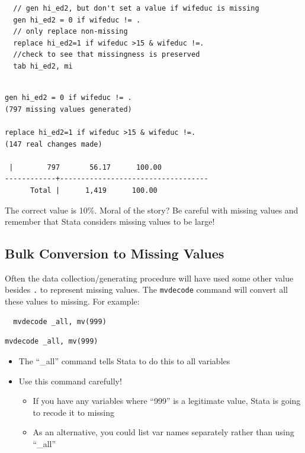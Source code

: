 \documentclass[]{book}
\providecommand{\tightlist}{%
  \setlength{\itemsep}{0pt}\setlength{\parskip}{0pt}}
\begin{document}
\begin{verbatim}
  // gen hi_ed2, but don't set a value if wifeduc is missing
  gen hi_ed2 = 0 if wifeduc != . 
  // only replace non-missing
  replace hi_ed2=1 if wifeduc >15 & wifeduc !=. 
  //check to see that missingness is preserved
  tab hi_ed2, mi
\end{verbatim}

\begin{verbatim}

gen hi_ed2 = 0 if wifeduc != . 
(797 missing values generated)

replace hi_ed2=1 if wifeduc >15 & wifeduc !=. 
(147 real changes made)

 |        797       56.17      100.00
------------+-----------------------------------
      Total |      1,419      100.00
\end{verbatim}

The correct value is 10\%. Moral of the story? Be careful with missing
values and remember that Stata considers missing values to be large!

\subsection{Bulk Conversion to Missing
Values}\label{bulk-conversion-to-missing-values}

Often the data collection/generating procedure will have used some other
value besides \texttt{.} to represent missing values. The
\texttt{mvdecode} command will convert all these values to missing. For
example:

\begin{verbatim}
  mvdecode _all, mv(999)
\end{verbatim}

\begin{verbatim}
mvdecode _all, mv(999)
\end{verbatim}

\begin{itemize}
\tightlist
\item
  The ``\_all'' command tells Stata to do this to all variables
\item
  Use this command carefully!

  \begin{itemize}
  \tightlist
  \item
    If you have any variables where ``999'' is a legitimate value, Stata
    is going to recode it to missing
  \item
    As an alternative, you could list var names separately rather than
    using ``\_all''
  \end{itemize}
\end{itemize}
\end{document}
